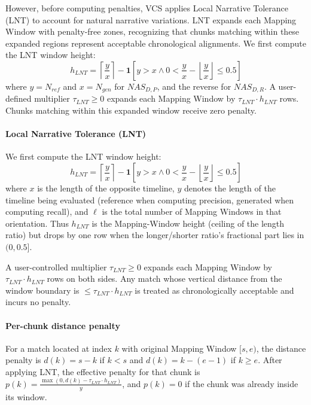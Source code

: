 \documentclass[main.tex]{subfiles}
\begin{document}
However, before computing penalties, VCS applies Local Narrative Tolerance (LNT) to account for natural narrative variations. LNT expands each Mapping Window with penalty-free zones, recognizing that chunks matching within these expanded regions represent acceptable chronological alignments. We first compute the LNT window height:
\begin{equation}
h_{LNT} = \left\lceil \frac{y}{x} \right\rceil - \mathbf{1}[y > x \land 0 < \frac{y}{x} - \left\lfloor \frac{y}{x} \right\rfloor \leq 0.5]
\end{equation}
where $y = N_{ref}$ and $x = N_{gen}$ for $NAS_{D,P}$, and the reverse for $NAS_{D,R}$. A user-defined multiplier $\tau_{LNT} \geq 0$ expands each Mapping Window by $\tau_{LNT} \cdot h_{LNT}$ rows. Chunks matching within this expanded window receive zero penalty.

\paragraph{Local Narrative Tolerance (LNT)}
We first compute the LNT window height:
\begin{equation}
h_{LNT} = \left\lceil \frac{y}{x} \right\rceil - \mathbf{1}[y > x \land 0 < \frac{y}{x} - \left\lfloor \frac{y}{x} \right\rfloor \leq 0.5]
\end{equation}
where $x$ is the length of the opposite timeline, $y$ denotes the length of the timeline being evaluated (reference when computing precision, generated when computing recall), and $\ell$ is the total number of Mapping Windows in that orientation. Thus $h_{LNT}$ is the Mapping-Window height (ceiling of the length ratio) but drops by one row when the longer/shorter ratio's fractional part lies in $(0, 0.5]$.

A user-controlled multiplier $\tau_{LNT} \geq 0$ expands each Mapping Window by $\tau_{LNT} \cdot h_{LNT}$ rows on both sides. Any match whose vertical distance from the window boundary is $\leq \tau_{LNT} \cdot h_{LNT}$ is treated as chronologically acceptable and incurs no penalty.

\paragraph{Per-chunk distance penalty}
For a match located at index $k$ with original Mapping Window $[s, e)$, the distance penalty is $d(k) = s - k$ if $k < s$ and $d(k) = k - (e - 1)$ if $k \geq e$. After applying LNT, the effective penalty for that chunk is $p(k) = \frac{\max(0, d(k) - \tau_{LNT} \cdot h_{LNT})}{y}$,
and $p(k) = 0$ if the chunk was already inside its window.
\end{document}
